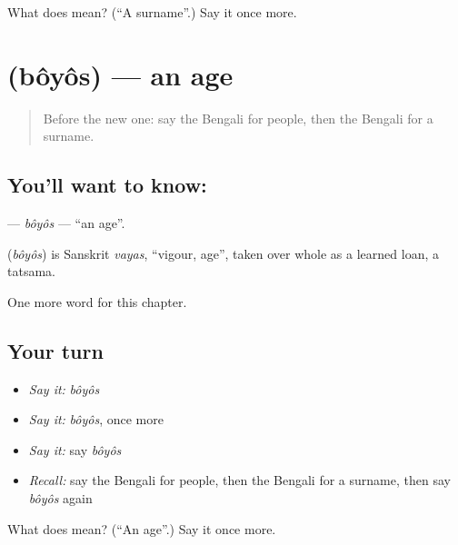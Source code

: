 \begin{tcolorbox}[breakable,colback=teal!4,colframe=teal!35!black,title={Before you move on}]
What does  mean? (\textquotedblleft{}A surname\textquotedblright{}.) Say it once more.
\end{tcolorbox}
\section[\texorpdfstring{\bn{বয়স} (bôyôs)}{বয়স (bôyôs)}]{ (bôyôs) — an age}

\label{lesson:BN-C227-boyos}



\begin{quote}
Before the new one: say the Bengali for people, then the Bengali for a surname.
\end{quote}

\subsection*{You'll want to know: }
\textbf{} — \emph{bôyôs} — \textquotedblleft{}an age\textquotedblright{}.

\begin{cousinweb}
\textbf{} (\emph{bôyôs}) is Sanskrit \emph{vayas}, \textquotedblleft{}vigour, age\textquotedblright{}, taken over whole as a learned loan, a tatsama.
\end{cousinweb}

\begin{grammarlens}[title={What you've built}]
One more word for this chapter.
\end{grammarlens}

\subsection*{Your turn}
\begin{itemize}
\raggedright
  \item \emph{Say it:} \emph{bôyôs}
  \item \emph{Say it:} \emph{bôyôs}, once more
  \item \emph{Say it:} say \emph{bôyôs}
  \item \emph{Recall:} say the Bengali for people, then the Bengali for a surname, then say \emph{bôyôs} again
\end{itemize}

\begin{tcolorbox}[breakable,colback=teal!4,colframe=teal!35!black,title={Before you move on}]
What does  mean? (\textquotedblleft{}An age\textquotedblright{}.) Say it once more.
\end{tcolorbox}
